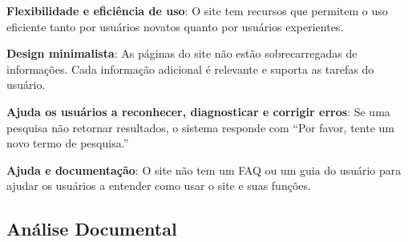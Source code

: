 \textbf{Flexibilidade e eficiência de uso}: O site tem recursos que permitem o uso eficiente tanto por usuários novatos quanto por usuários experientes.

\textbf{Design minimalista}: As páginas do site não estão sobrecarregadas de informações. Cada informação adicional é relevante e suporta as tarefas do usuário.

\textbf{Ajuda os usuários a reconhecer, diagnosticar e corrigir erros}: Se uma pesquisa não retornar resultados, o sistema responde com ``Por favor, tente um novo termo de pesquisa.''

\textbf{Ajuda e documentação}: O site não tem um FAQ ou um guia do usuário para ajudar os usuários a entender como usar o site e suas funções.

\subsection{Análise Documental}

